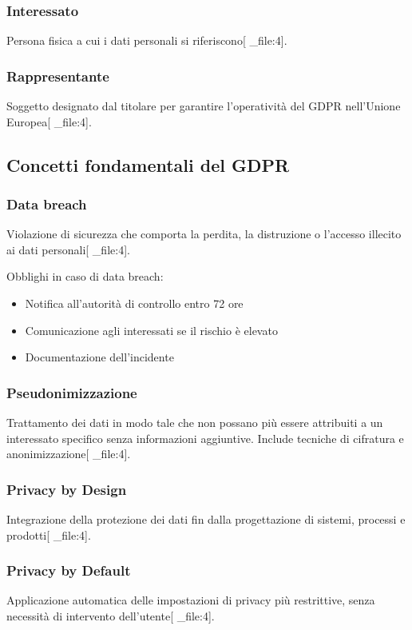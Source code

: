 \documentclass[12pt,a4paper]{article}
\begin{document}
\subsubsection{Interessato}
Persona fisica a cui i dati personali si riferiscono[ _file:4].

\subsubsection{Rappresentante}
Soggetto designato dal titolare per garantire l'operatività del GDPR nell'Unione Europea[ _file:4].

\subsection{Concetti fondamentali del GDPR}

\subsubsection{Data breach}
Violazione di sicurezza che comporta la perdita, la distruzione o l'accesso illecito ai dati personali[ _file:4].

Obblighi in caso di data breach:
\begin{itemize}
    \item Notifica all'autorità di controllo entro 72 ore
    \item Comunicazione agli interessati se il rischio è elevato
    \item Documentazione dell'incidente
\end{itemize}

\subsubsection{Pseudonimizzazione}
Trattamento dei dati in modo tale che non possano più essere attribuiti a un interessato specifico senza informazioni aggiuntive. Include tecniche di cifratura e anonimizzazione[ _file:4].

\subsubsection{Privacy by Design}
Integrazione della protezione dei dati fin dalla progettazione di sistemi, processi e prodotti[ _file:4].

\subsubsection{Privacy by Default}
Applicazione automatica delle impostazioni di privacy più restrittive, senza necessità di intervento dell'utente[ _file:4].
\end{document}
